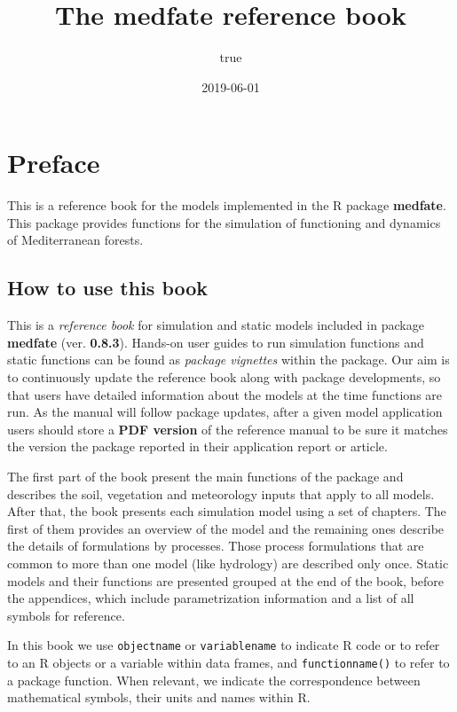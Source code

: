\documentclass[]{book}
\title{The medfate reference book}
\author{true}
\date{2019-06-01}
\begin{document}
\maketitle

{
\setcounter{tocdepth}{1}
\tableofcontents
}
\chapter*{Preface}\label{preface}

This is a reference book for the models implemented in the R package
\textbf{medfate}. This package provides functions for the simulation of
functioning and dynamics of Mediterranean forests.

\section*{How to use this book}\label{how-to-use-this-book}

This is a \emph{reference book} for simulation and static models
included in package \textbf{medfate} (ver. \textbf{0.8.3}). Hands-on
user guides to run simulation functions and static functions can be
found as \emph{package vignettes} within the package. Our aim is to
continuously update the reference book along with package developments,
so that users have detailed information about the models at the time
functions are run. As the manual will follow package updates, after a
given model application users should store a \textbf{PDF version} of the
reference manual to be sure it matches the version the package reported
in their application report or article.

The first part of the book present the main functions of the package and
describes the soil, vegetation and meteorology inputs that apply to all
models. After that, the book presents each simulation model using a set
of chapters. The first of them provides an overview of the model and the
remaining ones describe the details of formulations by processes. Those
process formulations that are common to more than one model (like
hydrology) are described only once. Static models and their functions
are presented grouped at the end of the book, before the appendices,
which include parametrization information and a list of all symbols for
reference.

In this book we use \texttt{objectname} or \texttt{variablename} to
indicate R code or to refer to an R objects or a variable within data
frames, and \texttt{functionname()} to refer to a package function. When
relevant, we indicate the correspondence between mathematical symbols,
their units and names within R.
\end{document}
